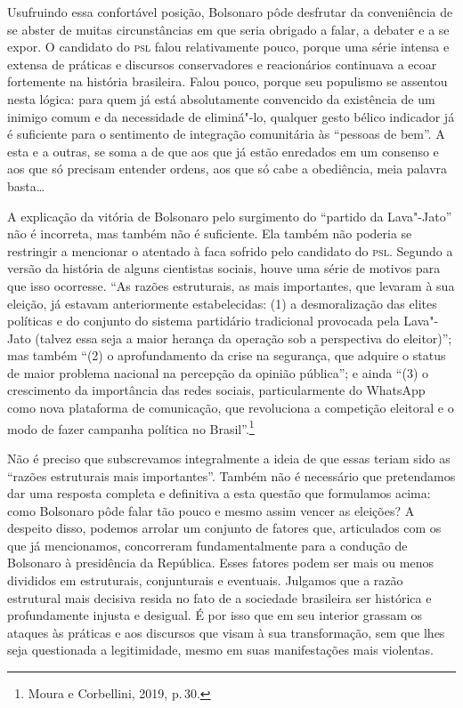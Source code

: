 Usufruindo essa confortável posição, Bolsonaro pôde desfrutar da
conveniência de se abster de muitas circunstâncias em que seria obrigado
a falar, a debater e a se expor. O candidato do \textsc{psl} falou relativamente
pouco, porque uma série intensa e extensa de práticas e discursos
conservadores e reacionários continuava a ecoar fortemente na história
brasileira. Falou pouco, porque seu populismo se assentou nesta lógica:
para quem já está absolutamente convencido da existência de um inimigo
comum e da necessidade de eliminá"-lo, qualquer gesto bélico indicador já
é suficiente para o sentimento de integração comunitária às ``pessoas de
bem''. A esta e a outras, se soma a de que aos que já estão enredados em
um consenso e aos que só precisam entender ordens, aos que só cabe a
obediência, meia palavra basta\ldots{}

A explicação da vitória de Bolsonaro pelo surgimento do ``partido da
Lava"-Jato'' não é incorreta, mas também não é suficiente. Ela também não
poderia se restringir a mencionar o atentado à faca sofrido pelo
candidato do \textsc{psl}. Segundo a versão da história de alguns cientistas
sociais, houve uma série de motivos para que isso ocorresse. ``As razões
estruturais, as mais importantes, que levaram à sua eleição, já estavam
anteriormente estabelecidas: (1) a desmoralização das elites políticas e
do conjunto do sistema partidário tradicional provocada pela Lava"-Jato
(talvez essa seja a maior herança da operação sob a perspectiva do
eleitor)''; mas também ``(2) o aprofundamento da crise na segurança, que
adquire o status de maior problema nacional na percepção da opinião
pública''; e ainda ``(3) o crescimento da importância das redes sociais,
particularmente do WhatsApp como nova plataforma de comunicação, que
revoluciona a competição eleitoral e o modo de fazer campanha política
no Brasil''.\footnote{Moura e Corbellini, 2019, p.\,30.}

Não é preciso que subscrevamos integralmente a ideia de que essas teriam
sido as ``razões estruturais mais importantes''. Também não é necessário
que pretendamos dar uma resposta completa e definitiva a esta questão
que formulamos acima: como Bolsonaro pôde falar tão pouco e mesmo assim
vencer as eleições? A despeito disso, podemos arrolar um conjunto de
fatores que, articulados com os que já mencionamos, concorreram
fundamentalmente para a condução de Bolsonaro à presidência da
República. Esses fatores podem ser mais ou menos divididos em
estruturais, conjunturais e eventuais. Julgamos que a razão estrutural
mais decisiva resida no fato de a sociedade brasileira ser histórica e
profundamente injusta e desigual. É por isso que em seu interior grassam
os ataques às práticas e aos discursos que visam à sua transformação,
sem que lhes seja questionada a legitimidade, mesmo em suas
manifestações mais violentas.

